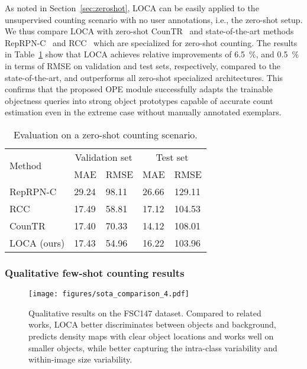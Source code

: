 \documentclass[10pt,twocolumn,letterpaper]{article}
\newcommand*\circledd[1]{\tikz[baseline=(char.base)]{
            \node[shape=circle,draw,inner sep=0.15pt] (char) {#1};}}
\newcommand{\first}[1]{{#1\raisebox{0.8pt}{\footnotesize \color{gold} \circledd{1}}}}
\newcommand{\second}[1]{{#1\raisebox{0.8pt}{\footnotesize \color{silver} \circledd{2}}}}
\newcommand{\third}[1]{{#1\raisebox{0.8pt}{\footnotesize \color{bronze} \circledd{3}}}}
\begin{document}
As noted in Section~\ref{sec:zeroshot}, LOCA can be easily applied to the unsupervised counting scenario with no user annotations, i.e., the zero-shot setup. 
We thus compare LOCA with zero-shot CounTR~\cite{countr} and state-of-the-art methods RepRPN-C~\cite{reprpn} and RCC~\cite{hobley} which are specialized for zero-shot counting. 
The results in Table~\ref{tab:results_zs} show that LOCA achieves relative improvements of 6.5~\%, and 0.5~\% in terms of RMSE on validation and test sets, respectively, compared to the state-of-the-art, and outperforms all zero-shot specialized architectures. This confirms that the proposed OPE module successfully adapts the trainable objectness queries into strong object prototypes capable of accurate count estimation even in the extreme case without manually annotated exemplars.




\begin{table}[htbp]
    \centering
    \begin{tabular}{l l l l l}\toprule
        \multirow{2}{*}{Method}& \multicolumn{2}{c}{Validation set} & \multicolumn{2}{c}{Test set} \\
        & MAE & RMSE & MAE & RMSE \\ 
        \midrule
        RepRPN-C \cite{reprpn} & 29.24 & 98.11 & 26.66 & 129.11 \\
        RCC \cite{hobley} & \third{17.49} & \second{58.81} & \third{17.12} & \second{104.53} \\
        CounTR \cite{countr} & \first{17.40} & \third{70.33} & \first{14.12} & \third{108.01} \\
LOCA (ours) & \second{17.43} & \first{54.96} & \second{16.22} & \first{103.96} \\
        \bottomrule
    \end{tabular}
    \caption{Evaluation on a zero-shot counting scenario.}
    \label{tab:results_zs}
\end{table}

\subsubsection{Qualitative few-shot counting results}

\begin{figure*}
    \centering
    \texttt{[image: figures/sota\_comparison\_4.pdf]}
    \caption{Qualitative results on the FSC147 dataset. Compared to related works, LOCA better discriminates between objects and background, predicts density maps with clear object locations and works well on smaller objects, while better capturing the intra-class variability and within-image size variability.}
    \label{fig:sota}
\end{figure*}
\end{document}
